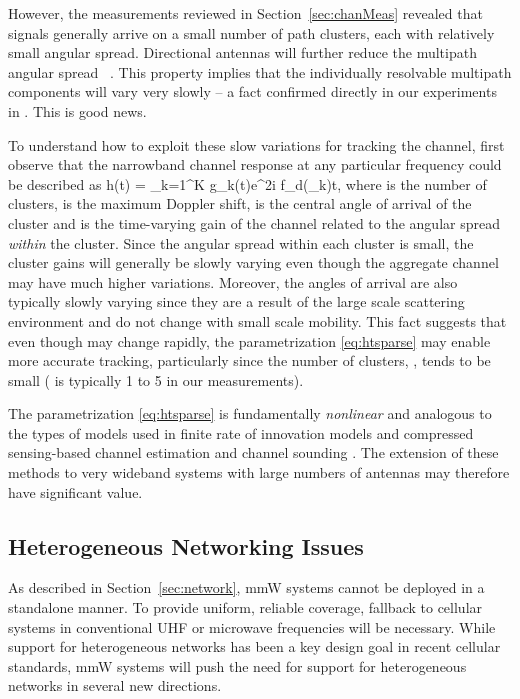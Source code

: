 \documentclass[journal]{IEEEtran}
\def\beq{}
\begin{document}
However, the measurements reviewed in Section~\ref{sec:chanMeas}
revealed that signals generally arrive on a small number
of path clusters, each with relatively small angular spread.
Directional antennas will further reduce the multipath angular spread
~\cite{durgin2000theory}.
This property implies that the individually resolvable multipath components
will vary very slowly -- a fact confirmed directly in our
experiments in \cite{rappaportmillimeter}.  This is good news.

To understand how to exploit these slow variations for tracking the channel,
first observe that
the narrowband channel response at any particular frequency could be described as
\beq\label{eq:htsparse}
    h(t) = \sum_{k=1}^K g_k(t)e^{2\pi i f_{d}\cos(\theta_k)t},
\eeq
where  is the number of clusters,  is the
maximum Doppler shift,  is the central angle of arrival
of the cluster and  is the time-varying gain of the channel related to the
angular spread \emph{within} the cluster.
Since the angular spread within each cluster is small,
the cluster gains  will generally be slowly
varying even though the aggregate channel  may have much higher variations.
Moreover, the angles of arrival  are also typically slowly varying
since they are a result of the large scale scattering environment and do not change
with small scale mobility.  This fact suggests that even though  may change
rapidly, the parametrization \eqref{eq:htsparse} may enable more accurate tracking,
particularly since the number of clusters, , tends to be small ( is typically
1 to 5 in our measurements).

The parametrization \eqref{eq:htsparse} is fundamentally \emph{nonlinear}
and analogous to the types of models used in finite rate of innovation models
\cite{VetterliMB:02} and compressed sensing-based channel estimation
and channel sounding \cite{TaubockHlaw:08,HauptBRN:10,BarbotinHRV:11,tamir2012analog}.
The extension
of these methods to very wideband systems with large numbers of antennas may therefore
have significant value.

\subsection{Heterogeneous Networking Issues} \label{sec:hetNet}

As described in Section~\ref{sec:network},
mmW systems cannot be deployed in a standalone manner.
To provide uniform, reliable coverage, fallback to cellular
systems in conventional UHF or microwave frequencies will be necessary.
While support for heterogeneous networks has been a key design goal
in recent cellular standards,  mmW systems will push the need for support
for heterogeneous networks in several new directions.
\end{document}
